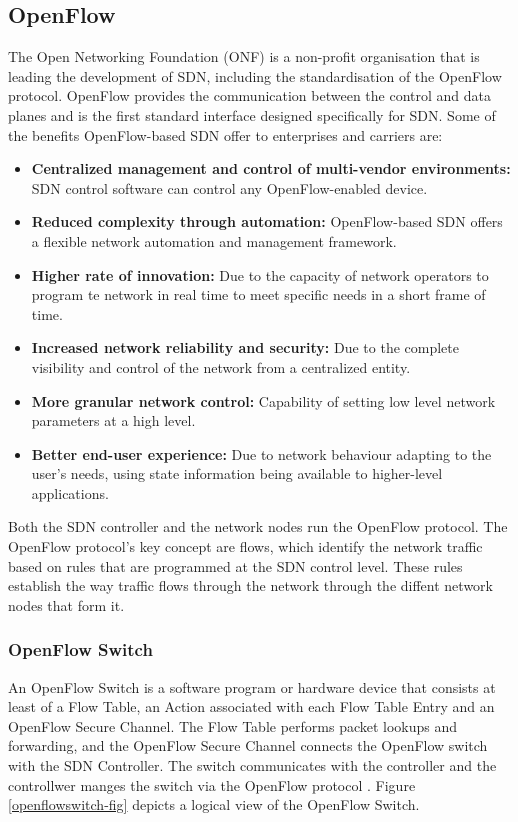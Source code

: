 \subsection{OpenFlow}\label{sec:chap2_sdn_openflow}

The Open Networking Foundation (ONF) is a non-profit organisation that is leading the development of SDN, including the standardisation of the OpenFlow protocol. OpenFlow provides the communication between the control and data planes and is the first standard interface designed specifically for SDN. Some of the benefits OpenFlow-based SDN offer to enterprises and carriers are:

\begin{itemize}
\item{\textbf{Centralized management and control of multi-vendor environments:} SDN control software can control any OpenFlow-enabled device.}
\item{\textbf{Reduced complexity through automation:} OpenFlow-based SDN offers a flexible network automation and management framework.}
\item{\textbf{Higher rate of innovation:} Due to the capacity of network operators to program te network in real time to meet specific needs in a short frame of time.}
\item{\textbf{Increased network reliability and security:} Due to the complete visibility and control of the network from a centralized entity.}
\item{\textbf{More granular network control:} Capability of setting low level network parameters at a high level.}
\item{\textbf{Better end-user experience:} Due to network behaviour adapting to the user's needs, using state information being available to higher-level applications.}
\end{itemize}

Both the SDN controller and the network nodes run the OpenFlow protocol. The OpenFlow protocol's key concept are flows, which identify the network traffic based on rules that are programmed at the SDN control level. These rules establish the way traffic flows through the network through the diffent network nodes that form it.

\subsubsection{OpenFlow Switch}\label{sec:chap2_sdn_openflow_switch}

An OpenFlow Switch is a software program or hardware device that consists at least of a Flow Table, an Action associated with each Flow Table Entry and an OpenFlow Secure Channel. The Flow Table performs packet lookups and forwarding, and the OpenFlow Secure Channel connects the OpenFlow switch with the SDN Controller. The switch communicates with the controller and the controllwer manges the switch via the OpenFlow protocol \cite{of_switch_spec}. Figure \ref{openflowswitch-fig} depicts a logical view of the OpenFlow Switch.\\

